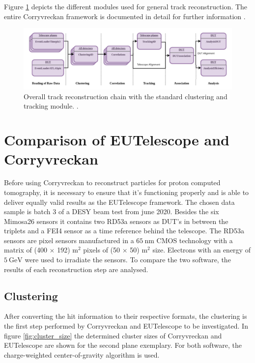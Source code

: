 Figure \ref{fig:corry_track_reco} depicts
the different modules used for general track reconstruction. The entire Corryvreckan framework is documented in detail for further information \cite{corry_manual}.

\begin{figure}
  \centering
  \includegraphics[height=0.3\textwidth]{images/corry.png}
  \caption{Overall track reconstruction chain with the standard clustering and tracking module. \cite{corry_track_reco}.}
  \label{fig:corry_track_reco}
\end{figure}

\chapter{Comparison of EUTelescope and Corryvreckan}\label{make}
Before using Corryvreckan to reconstruct particles for proton computed tomography, it is necessary to ensure that it's functioning properly
and is able to deliver equally valid results as the EUTelescope framework.
The chosen data sample is batch 3 of a DESY beam test from june 2020. Besides the six Mimosa26 sensors it contains two RD53a sensors
as DUT's in between the triplets and a FEI4 sensor as a time reference behind the telescope. The RD53a sensors are pixel sensors
manufactured in a $\SI{65}{\nano\meter}$ CMOS technology with a matrix of (400 $\times$ 192) \textmu m$^2$ pixels of
(50 $\times$ 50) \textmu m$^2$ size. Electrons with an energy of $\SI{5}{\GeV}$ were used to irradiate the sensors.
To compare the two software, the results of each
reconstruction step are analysed. \\

\section{Clustering}
After converting the hit information to their respective formats, the clustering is the first step performed by Corryvreckan and EUTelescope
to be investigated.
In figure \ref{fig:cluster_size} the determined cluster sizes of Corryvreckan and EUTelescope are shown for the second plane exemplary.
For both software, the charge-weighted center-of-gravity algorithm is used.

